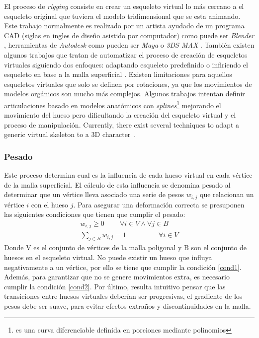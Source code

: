 El proceso de \emph{rigging} consiste en crear un esqueleto virtual lo más cercano a el esqueleto original que tuviera el modelo tridimensional que se esta animando. Este trabajo normalmente es realizado por un artista ayudado de un programa CAD (siglas en ingles de diseño asistido por computador) como puede ser \emph{Blender} \cite{a}, herramientas de \emph{Autodesk} como pueden ser \emph{Maya} o \emph{3DS MAX} \cite{a}. También existen algunos trabajos que tratan de automatizar el proceso de creación de esqueletos virtuales siguiendo dos enfoques: adaptando esqueleto predefinido \cite{a} o infiriendo el esqueleto en base a la malla superficial \cite{a}.
Existen limitaciones para aquellos esqueletos virtuales que solo se definen por rotaciones, ya que los movimientos de modelos orgánicos son mucho más complejos. Algunos trabajos intentan definir articulaciones basado en modelos anatómicos \cite{joints} con \emph{splines}\footnote{ es una curva diferenciable definida en porciones mediante polinomios} mejorando el movimiento del hueso pero dificultando la creación del esqueleto virtual y el proceso de manipulación.
Currently, there exist several techniques to adapt a generic virtual skeleton to a 3D character~\cite{huang2013robust,feng2014fast,pan2017automatic}.


\subsubsection{Pesado}
\label{art:pesado}

Este proceso  determina cual es la influencia de cada hueso virtual en cada vértice de la malla superficial. El cálculo de esta influencia se denomina pesado al determinar que un vértice lleva asociado una serie de pesos $w_{i,j}$ que relacionan un vértice $i$ con el hueso $j$.
Para asegurar una deformación correcta se presuponen las siguientes condiciones que tienen que cumplir el pesado:
\begin{eqnarray}
\label{cond1}
w_{i,j}\geq 0 \;\;\;\;\;\;\;\; \forall i \in V \wedge \forall j \in B   \\
\label{cond2}
\sum_{j \in B} w_{i,j} = 1\ \;\;\;\;\;\;\;\;\;\;\;\;\;\;\;\;
\forall i \in V
\end{eqnarray}
Donde V es el conjunto de vértices de la malla poligonal y B son el conjunto de huesos en el esqueleto virtual. No puede existir un hueso que influya negativamente a un vértice, por ello se tiene que cumplir la condición \ref{cond1}. Además, para garantizar que no se genere movimientos extra, es necesario cumplir la condición \ref{cond2}.
Por último, resulta intuitivo pensar que las transiciones entre huesos virtuales deberían ser progresivas, el gradiente de los pesos debe ser suave, para evitar efectos extraños y discontinuidades en la malla.

